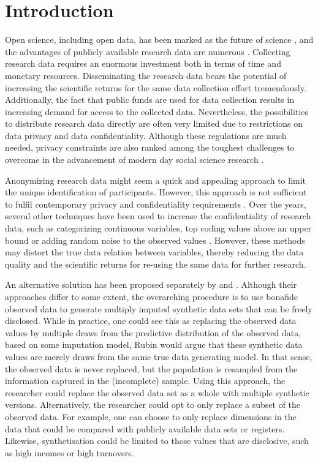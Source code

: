 \documentclass[psych,article,submit,moreauthors,pdftex]{mdpi}
\begin{document}

\hypertarget{introduction}{%
\section{Introduction}\label{introduction}}

Open science, including open data, has been marked as the future of
science \citep{gewin_data_2016}, and the advantages of publicly
available research data are numerous
\citep{molloy_open_2011, walport_brest_sharing_2011}. Collecting
research data requires an enormous investment both in terms of time and
monetary resources. Disseminating the research data bears the potential
of increasing the scientific returns for the same data collection effort
tremendously. Additionally, the fact that public funds are used for data
collection results in increasing demand for access to the collected
data. Nevertheless, the possibilities to distribute research data
directly are often very limited due to restrictions on data privacy and
data confidentiality. Although these regulations are much needed,
privacy constraints are also ranked among the toughest challenges to
overcome in the advancement of modern day social science research
\citep{lazer_life_2009}.

Anonymizing research data might seem a quick and appealing approach to
limit the unique identification of participants. However, this approach
is not sufficient to fulfil contemporary privacy and confidentiality
requirements \citep{ohm_broken_2009, national_putting_2007}. Over the
years, several other techniques have been used to increase the
confidentiality of research data, such as categorizing continuous
variables, top coding values above an upper bound or adding random noise
to the observed values \citep{drechsler_synthetic_2011}. However, these
methods may distort the true data relation between variables, thereby
reducing the data quality and the scientific returns for re-using the
same data for further research.

An alternative solution has been proposed separately by
\citet{rubin_statistical_disclosure_1993} and
\citet{little_statistical_1993}. Although their approaches differ to
some extent, the overarching procedure is to use bonafide observed data
to generate multiply imputed synthetic data sets that can be freely
disclosed. While in practice, one could see this as replacing the
observed data values by multiple draws from the predictive distribution
of the observed data, based on some imputation model, Rubin would argue
that these synthetic data values are merely draws from the same true
data generating model. In that sense, the observed data is never
replaced, but the population is resampled from the information captured
in the (incomplete) sample. Using this approach, the researcher could
replace the observed data set as a whole with multiple synthetic
versions. Alternatively, the researcher could opt to only replace a
subset of the observed data. For example, one can choose to only replace
dimensions in the data that could be compared with publicly available
data sets or registers. Likewise, synthetisation could be limited to
those values that are disclosive, such as high incomes or high
turnovers.
\end{document}
